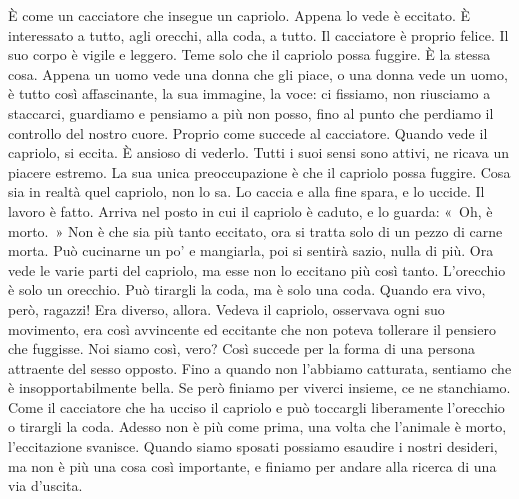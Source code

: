 È come un cacciatore che insegue un capriolo. Appena lo vede è eccitato.
È interessato a tutto, agli orecchi, alla coda, a tutto. Il cacciatore è
proprio felice. Il suo corpo è vigile e leggero. Teme solo che il
capriolo possa fuggire. È la stessa cosa. Appena un uomo vede una donna
che gli piace, o una donna vede un uomo, è tutto così affascinante, la
sua immagine, la voce: ci fissiamo, non riusciamo a staccarci, guardiamo
e pensiamo a più non posso, fino al punto che perdiamo il controllo del
nostro cuore. Proprio come succede al cacciatore. Quando vede il
capriolo, si eccita. È ansioso di vederlo. Tutti i suoi sensi sono
attivi, ne ricava un piacere estremo. La sua unica preoccupazione è che
il capriolo possa fuggire. Cosa sia in realtà quel capriolo, non lo sa.
Lo caccia e alla fine spara, e lo uccide. Il lavoro è fatto. Arriva nel
posto in cui il capriolo è caduto, e lo guarda: «~Oh, è morto.~» Non è
che sia più tanto eccitato, ora si tratta solo di un pezzo di carne
morta. Può cucinarne un po' e mangiarla, poi si sentirà sazio, nulla di
più. Ora vede le varie parti del capriolo, ma esse non lo eccitano più
così tanto. L'orecchio è solo un orecchio. Può tirargli la coda, ma è
solo una coda. Quando era vivo, però, ragazzi! Era diverso, allora.
Vedeva il capriolo, osservava ogni suo movimento, era così avvincente ed
eccitante che non poteva tollerare il pensiero che fuggisse. Noi siamo
così, vero? Così succede per la forma di una persona attraente del sesso
opposto. Fino a quando non l'abbiamo catturata, sentiamo che è
insopportabilmente bella. Se però finiamo per viverci insieme, ce ne
stanchiamo. Come il cacciatore che ha ucciso il capriolo e può toccargli
liberamente l'orecchio o tirargli la coda. Adesso non è più come prima,
una volta che l'animale è morto, l'eccitazione svanisce. Quando siamo
sposati possiamo esaudire i nostri desideri, ma non è più una cosa così
importante, e finiamo per andare alla ricerca di una via d'uscita.

